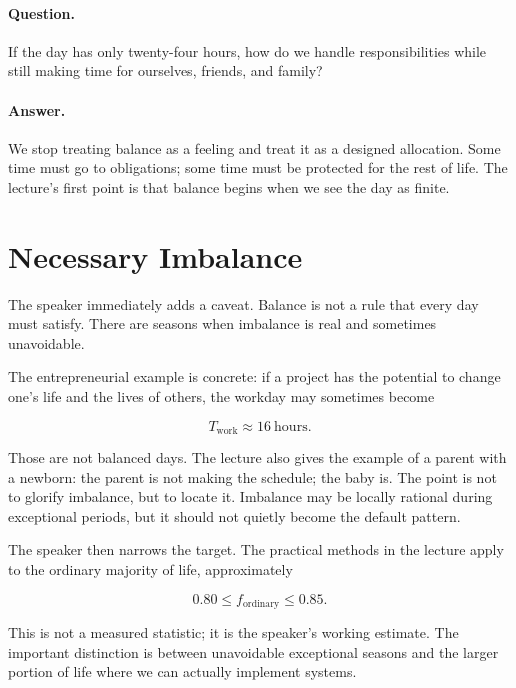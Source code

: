 \paragraph{Question.}
If the day has only twenty-four hours, how do we handle responsibilities while still making time for ourselves, friends, and family?

\paragraph{Answer.}
We stop treating balance as a feeling and treat it as a designed allocation. Some time must go to obligations; some time must be protected for the rest of life. The lecture's first point is that balance begins when we see the day as finite.

\section{Necessary Imbalance}

The speaker immediately adds a caveat. Balance is not a rule that every day must satisfy. There are seasons when imbalance is real and sometimes unavoidable.

The entrepreneurial example is concrete: if a project has the potential to change one's life and the lives of others, the workday may sometimes become

\begin{equation}
T_{\mathrm{work}} \approx 16\ \mathrm{hours}.
\end{equation}

Those are not balanced days. The lecture also gives the example of a parent with a newborn: the parent is not making the schedule; the baby is. The point is not to glorify imbalance, but to locate it. Imbalance may be locally rational during exceptional periods, but it should not quietly become the default pattern.

The speaker then narrows the target. The practical methods in the lecture apply to the ordinary majority of life, approximately

\begin{equation}
0.80 \leq f_{\mathrm{ordinary}} \leq 0.85.
\end{equation}

This is not a measured statistic; it is the speaker's working estimate. The important distinction is between unavoidable exceptional seasons and the larger portion of life where we can actually implement systems.

